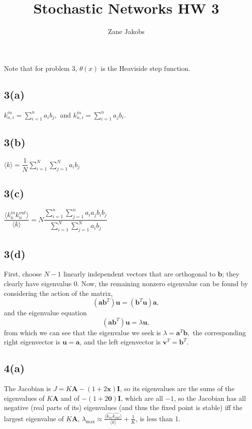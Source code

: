 \documentclass[11pt]{article}
\begin{document}
\title{Stochastic Networks HW 3}
\author{Zane Jakobs}
\date{}
\maketitle
Note that for problem 3, $\theta(x)$ is the Heaviside step function.
\subsection*{3(a)} $k^{in}_{n,i} = \sum\limits_{i=1}^n a_ib_j,$ and $k^{in}_{n,i} = \sum\limits_{i=1}^n a_jb_i.$
\subsection*{3(b)} $\langle k\rangle = \dfrac{1}{N}\sum\limits_{i=1}^N \sum\limits_{j=1}^N a_i b_j$
\subsection*{3(c)} $\dfrac{\langle k^{in}_n k^{out}_n\rangle}{\langle k \rangle}  =  N\dfrac{\sum\limits_{i=1}^n\sum\limits_{j=1}^n a_ia_jb_ib_j}{\sum\limits_{i=1}^N\sum\limits_{j=1}^N a_i b_j}$
\subsection*{3(d)} First, choose $N-1$ linearly independent vectors that are orthogonal to $\bm{b}$; they clearly have eigenvalue 0. Now, the remaining nonzero eigenvalue can be found by considering the action of the matrix,
\[
(\bm{a}\bm{b}^T)\bm{u} = (\bm{b}^T\bm{u})\bm{a},
\]
and the eigenvalue equation
\[
(\bm{a}\bm{b}^T)\bm{u} = \lambda \bm{u},
\]
from which we can see that the eigenvalue we seek is $\lambda = \bm{a}^T\bm{b},$ the corresponding right eigenvector is $\bm{u} = \bm{a}$, and the left eigenvector is $\bm{v}^T = \bm{b}^T$.
\subsection*{4(a)} The Jacobian is $J = K\bm{A} - (1+2\bm{x})\bm{I}$, so its eigenvalues are the sums of the eigenvalues of $K\bm{A}$ and of $-(1+2\bm{0})\bm{I}$, which are all $-1$, so the Jacobian has all negative (real parts of its) eigenvalues (and thus the fixed point is stable) iff the largest eigenvalue of $K\bm{A}$, $\lambda_{\text{max}} \approx  \frac{\langle\hat{k_{in}}\hat{k_{out}}\rangle}{\langle k \rangle} + \frac{1}{K}$, is less than 1.
\end{document}

